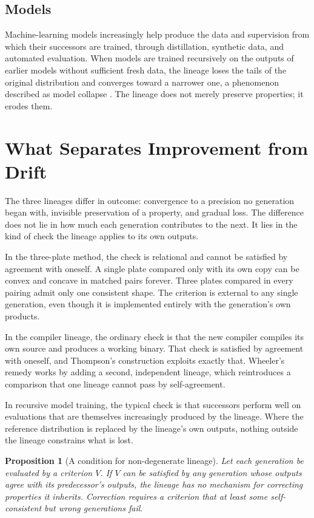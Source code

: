 \documentclass[11pt]{article}
\newtheorem{proposition}{Proposition}
\theoremstyle{definition}
\theoremstyle{remark}
\begin{document}
\subsection*{Models}

Machine-learning models increasingly help produce the data and supervision from which their successors are trained, through distillation, synthetic data, and automated evaluation. When models are trained recursively on the outputs of earlier models without sufficient fresh data, the lineage loses the tails of the original distribution and converges toward a narrower one, a phenomenon described as model collapse \cite{shumailov2024}. The lineage does not merely preserve properties; it erodes them.

\section{What Separates Improvement from Drift}

The three lineages differ in outcome: convergence to a precision no generation began with, invisible preservation of a property, and gradual loss. The difference does not lie in how much each generation contributes to the next. It lies in the kind of check the lineage applies to its own outputs.

In the three-plate method, the check is relational and cannot be satisfied by agreement with oneself. A single plate compared only with its own copy can be convex and concave in matched pairs forever. Three plates compared in every pairing admit only one consistent shape. The criterion is external to any single generation, even though it is implemented entirely with the generation's own products.

In the compiler lineage, the ordinary check is that the new compiler compiles its own source and produces a working binary. That check is satisfied by agreement with oneself, and Thompson's construction exploits exactly that. Wheeler's remedy works by adding a second, independent lineage, which reintroduces a comparison that one lineage cannot pass by self-agreement.

In recursive model training, the typical check is that successors perform well on evaluations that are themselves increasingly produced by the lineage. Where the reference distribution is replaced by the lineage's own outputs, nothing outside the lineage constrains what is lost.

\begin{proposition}[A condition for non-degenerate lineage]
Let each generation be evaluated by a criterion $V$. If $V$ can be satisfied by any generation whose outputs agree with its predecessor's outputs, the lineage has no mechanism for correcting properties it inherits. Correction requires a criterion that at least some self-consistent but wrong generations fail.
\end{proposition}
\end{document}
